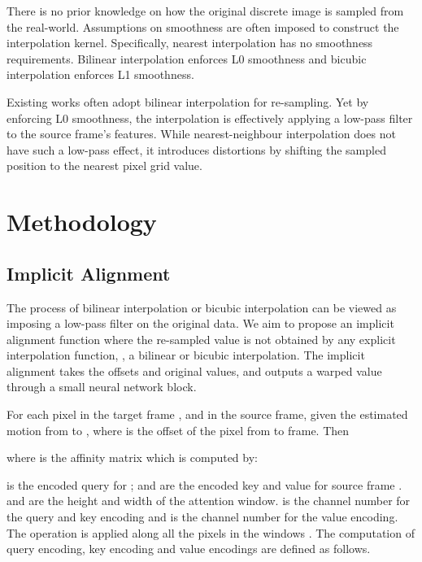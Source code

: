 \documentclass[10pt,twocolumn,letterpaper]{article}
\begin{document}
There is no prior knowledge on how the original discrete image is sampled from the real-world. Assumptions on smoothness are often imposed to construct the interpolation kernel. Specifically, nearest interpolation has no smoothness requirements.  Bilinear interpolation enforces L0 smoothness and bicubic interpolation enforces L1 smoothness. 

Existing works often adopt bilinear interpolation for re-sampling.  Yet by enforcing L0 smoothness, the interpolation is effectively applying a low-pass filter to the source frame's features. While nearest-neighbour interpolation does not have such a low-pass effect, 
it introduces distortions by shifting the sampled position to the nearest pixel grid value.














\section{Methodology}

\subsection{Implicit Alignment}

The process of bilinear interpolation or bicubic interpolation can be viewed as imposing a low-pass filter on the original data\cite{youssef1998analysis}. We aim to propose an implicit alignment function where the re-sampled value is not obtained by 
any explicit interpolation function, \eg, a bilinear or bicubic interpolation. The implicit alignment takes the offsets and original values, and outputs a warped value through a small neural network block.

For each pixel  in the target frame , and  in the source frame, given the estimated motion  from  to , where  is the offset of the pixel from  to  frame. Then 



where  is the affinity matrix which is computed by:



 is the encoded query for ;  and  are the encoded key and value for source frame .  and  are the height and width of the attention window.   is the channel number for the query and key encoding and  is the channel number for the value encoding. The  operation is applied along all the pixels in the windows . The computation of query encoding, key encoding and value encodings are defined as follows.
\end{document}
